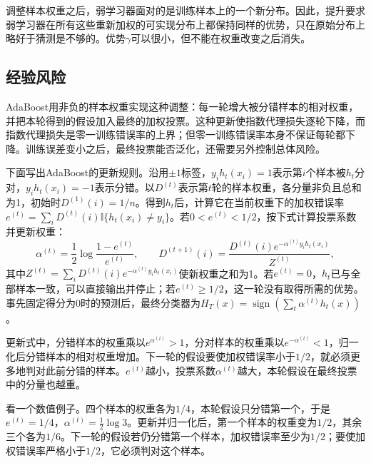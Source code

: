调整样本权重之后，弱学习器面对的是训练样本上的一个新分布。因此，提升要求弱学习器在所有这些重新加权的可实现分布上都保持同样的优势，只在原始分布上略好于猜测是不够的。优势$\gamma$可以很小，但不能在权重改变之后消失。

\subsection{经验风险}

AdaBoost用非负的样本权重实现这种调整：每一轮增大被分错样本的相对权重，并把本轮得到的假设加入最终的加权投票。这种更新使指数代理损失逐轮下降，而指数代理损失是零一训练错误率的上界；但零一训练错误率本身不保证每轮都下降。训练误差变小之后，最终投票能否泛化，还需要另外控制总体风险。

下面写出AdaBoost的更新规则。沿用$\pm1$标签，$y_ih_t(x_i)=1$表示第$i$个样本被$h_t$分对，$y_ih_t(x_i)=-1$表示分错。以$D^{(t)}$表示第$t$轮的样本权重，各分量非负且总和为1，初始时$D^{(1)}(i)=1/n$。得到$h_t$后，计算它在当前权重下的加权错误率$e^{(t)}=\sum_iD^{(t)}(i)\mathbb I\{h_t(x_i)\neq y_i\}$。若$0<e^{(t)}<1/2$，按下式计算投票系数并更新权重：
\begin{equation}
 \alpha^{(t)}=\frac12\log\frac{1-e^{(t)}}{e^{(t)}},\qquad
 D^{(t+1)}(i)=\frac{D^{(t)}(i)e^{-\alpha^{(t)} y_i h_t(x_i)}}{Z^{(t)}},
 \label{eq:adaboost-update}
\end{equation}
其中$Z^{(t)}=\sum_iD^{(t)}(i)e^{-\alpha^{(t)}y_ih_t(x_i)}$使新权重之和为1。若$e^{(t)}=0$，$h_t$已与全部样本一致，可以直接输出并停止；若$e^{(t)}\geq1/2$，这一轮没有取得所需的优势。事先固定得分为0时的预测后，最终分类器为$H_T(x)=\operatorname{sign}(\sum_t\alpha^{(t)}h_t(x))$。

更新式中，分错样本的权重乘以$e^{\alpha^{(t)}}>1$，分对样本的权重乘以$e^{-\alpha^{(t)}}<1$，归一化后分错样本的相对权重增加。下一轮的假设要使加权错误率小于$1/2$，就必须更多地判对此前分错的样本。$e^{(t)}$越小，投票系数$\alpha^{(t)}$越大，本轮假设在最终投票中的分量也越重。

看一个数值例子。四个样本的权重各为$1/4$，本轮假设只分错第一个，于是$e^{(t)}=1/4$，$\alpha^{(t)}=\tfrac12\log3$。更新并归一化后，第一个样本的权重变为$1/2$，其余三个各为$1/6$。下一轮的假设若仍分错第一个样本，加权错误率至少为$1/2$；要使加权错误率严格小于$1/2$，它必须判对这个样本。

